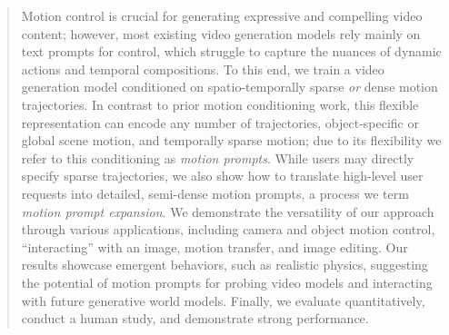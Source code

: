 \begin{abstract}

Motion control is crucial for generating expressive and compelling video content; however, most existing video generation models rely mainly on text prompts for control, which struggle to capture the nuances of dynamic actions and temporal compositions. To this end, we train a video generation model conditioned on spatio-temporally sparse \emph{or} dense motion trajectories.
In contrast to prior motion conditioning work, this flexible representation can encode any number of trajectories, object-specific or global scene motion, and temporally sparse motion; due to its flexibility we refer to this conditioning as \emph{motion prompts}. While users may directly specify sparse trajectories, we also show how to translate high-level user requests into detailed, semi-dense motion prompts, a process we term \emph{motion prompt expansion}. 
We demonstrate the versatility of our approach through various applications, including camera and object motion control, ``interacting'' with an image, motion transfer, and image editing.  Our results showcase emergent behaviors, such as realistic physics, suggesting the potential of motion prompts for probing video models and interacting with future generative world models.  Finally, we evaluate quantitatively, conduct a human study, and demonstrate strong performance.






\end{abstract}